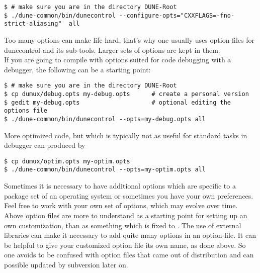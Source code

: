 \begin{lstlisting}[style=Bash]
$ # make sure you are in the directory DUNE-Root
$ ./dune-common/bin/dunecontrol --configure-opts="CXXFLAGS=-fno-strict-aliasing"  all
\end{lstlisting}

Too many options can make life hard, that's why one usually uses option-files for dunecontrol and its sub-tools.
Larger sets of options are kept in them. \\

If you are going to compile with options suited for code debugging with a debugger, the following
can be a starting point:


\begin{lstlisting}[style=Bash]
$ # make sure you are in the directory DUNE-Root
$ cp dumux/debug.opts my-debug.opts      # create a personal version
$ gedit my-debug.opts                    # optional editing the options file 
$ ./dune-common/bin/dunecontrol --opts=my-debug.opts all 
\end{lstlisting}

More optimized code, but which is typically not as useful for standard tasks in debugger can produced by 

\begin{lstlisting}[style=Bash]
$ cp dumux/optim.opts my-optim.opts 
$ ./dune-common/bin/dunecontrol --opts=my-optim.opts all
\end{lstlisting}

Sometimes it is necessary to have additional options which
are specific to a package set of an operating system or
sometimes you have your own preferences.
Feel free to work with your own set of options, which may evolve over time.
Above option files are more to understand as a starting point
for setting up an own customization, than as something which is fixed to \Dumux.
The use of external libraries can make it necessary to add quite many options in an option-file.
It can be helpful to give your customized option file its own name, as done above.
So one avoids to be confused with option files that came out of distribution
and can possible updated by subversion later on.

